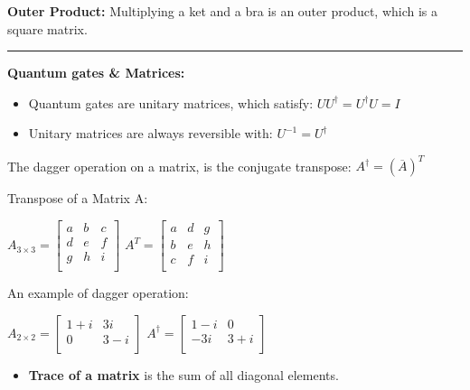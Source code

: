 \documentclass{article}
\begin{document}
\textbf{Outer Product:} Multiplying a ket and a bra is an outer product, which is a square matrix.

\vspace{5pt}
\hrule 
\vspace{5pt}

\textbf{Quantum gates \& Matrices:}

\begin{itemize}
	\item Quantum gates are unitary matrices, which satisfy: $UU^\dagger = U^\dagger U = I$
	\item Unitary matrices are always reversible with: $U^{-1} = U^\dagger$
\end{itemize}

The dagger operation on a matrix, is the conjugate transpose:  $A^\dagger= (\overline{A})^T$

Transpose of a Matrix A:
\begin{center}
$
  A_{3\times3} =
  \left[ {\begin{array}{ccc}
    a & b & c \\
    d & e & f \\
    g & h & i \\
  \end{array} } \right]
$
\qquad
$
  A^T =
  \left[ {\begin{array}{ccc}
    a & d & g \\
    b & e & h \\
    c & f & i \\
  \end{array} } \right]
$
\end{center}

An example of dagger operation:

\begin{center}
$
  A_{2\times2} =
  \left[ {\begin{array}{cc}
    1 + i & 3i \\
    0 & 3 - i \\
  \end{array} } \right]
$
\qquad
$
  A^\dagger =
  \left[ {\begin{array}{cc}
    1 -i & 0 \\
    -3i & 3 + i \\
  \end{array} } \right]
$
\end{center}

\begin{itemize}
	\item \textbf{Trace of a matrix} is the sum of all diagonal elements.
\end{itemize}
\end{document}
